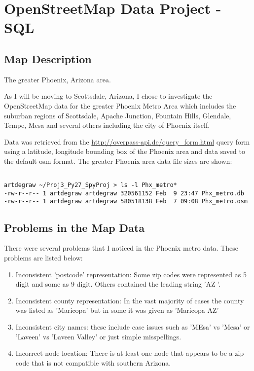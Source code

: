 \documentclass{article}
\begin{document}
\section{OpenStreetMap Data Project - SQL}
\subsection{Map Description}

The greater Phoenix, Arizona area.


As I will be moving to Scottsdale, Arizona, I chose to investigate the OpenStreetMap data for the greater Phoenix Metro Area which includes the suburban regions of Scottsdale, Apache Junction, Fountain Hills, Glendale, Tempe, Mesa and several others including the city of Phoenix itself.

Data was retrieved from the \url{http://overpass-api.de/query_form.html} query form using a latitude, longitude bounding box of the Phoenix area and data saved to the default osm format.  The greater Phoenix area data file sizes are shown: 
\begin{verbatim}

artdegraw ~/Proj3_Py27_SpyProj > ls -l Phx_metro*
-rw-r--r-- 1 artdegraw artdegraw 320561152 Feb  9 23:47 Phx_metro.db
-rw-r--r-- 1 artdegraw artdegraw 580518138 Feb  7 09:08 Phx_metro.osm

\end{verbatim}

\subsection{Problems in the Map Data}
There were several problems that I noticed in the Phoenix metro data. These problems are listed below:
\begin{enumerate}
\item Inconsistent 'postcode' representation:  Some zip codes were represented as 5 digit and some as 9 digit.  Others contained the leading string 'AZ '.
\item Inconsistent county representation:  In the vast majority of cases the county was listed as 'Maricopa' but in some it was given as 'Maricopa AZ'
\item Inconsistent city names: these include case issues such as 'MEsa' vs 'Mesa' or 'Laveen' vs 'Laveen Valley' or just simple misspellings.
\item Incorrect node location: There is at least one node that appears to be a zip code that is not compatible with southern Arizona.
\end{enumerate}
\end{document}

